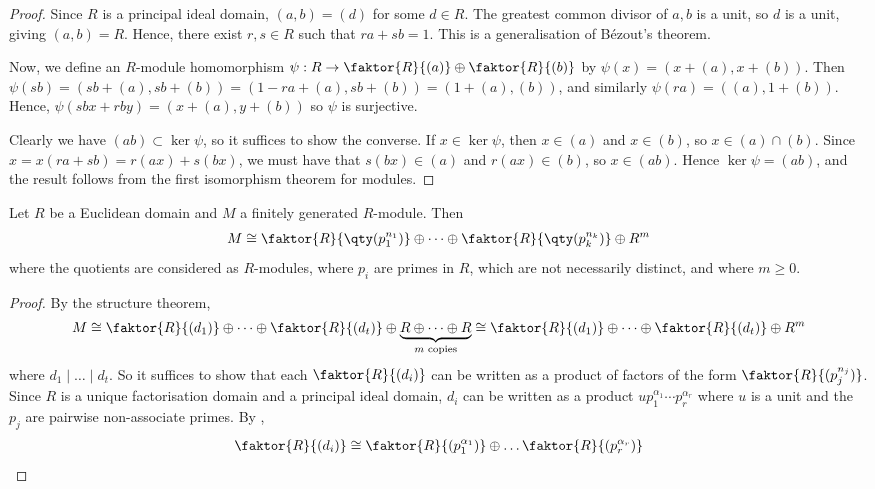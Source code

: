 \begin{proof}
	Since $R$ is a principal ideal domain, $(a,b) = (d)$ for some $d \in R$.
	The greatest common divisor of $a, b$ is a unit, so $d$ is a unit, giving $(a,b) = R$.
	Hence, there exist $r,s \in R$ such that $ra + sb = 1$.
	This is a generalisation of B\'ezout's theorem.

	Now, we define an $R$-module homomorphism $\psi : R \to \faktor{R}{(a)} \oplus \faktor{R}{(b)}$ by $\psi(x) = (x+(a), x+(b))$.
	Then $\psi(sb) = (sb+(a), sb+(b)) = (1-ra+(a),sb+(b)) = (1+(a), (b))$, and similarly $\psi(ra) = ((a),1+(b))$.
	Hence, $\psi(sbx + rby) = (x+(a),y+(b))$ so $\psi$ is surjective.

	Clearly we have $(ab) \subset \ker \psi$, so it suffices to show the converse.
	If $x \in \ker \psi$, then $x \in (a)$ and $x \in (b)$, so $x \in (a) \cap (b)$.
	Since $x = x(ra+sb) = r(ax) + s(bx)$, we must have that $s(bx) \in (a)$ and $r(ax) \in (b)$, so $x \in (ab)$.
	Hence $\ker \psi = (ab)$, and the result follows from the first isomorphism theorem for modules.
\end{proof}

\begin{lemma}
	Let $R$ be a Euclidean domain and $M$ a finitely generated $R$-module.
	Then
	\begin{align*}
		M \cong \faktor{R}{\qty(p_1^{n_1})} \oplus \dots \oplus \faktor{R}{\qty(p_k^{n_k})} \oplus R^m
	\end{align*}
	where the quotients are considered as $R$-modules, where $p_i$ are primes in $R$, which are not necessarily distinct, and where $m \geq 0$.
\end{lemma}

\begin{proof}
	By the structure theorem,
	\begin{align*}
		M \cong \faktor{R}{(d_1)} \oplus \dots \oplus \faktor{R}{(d_t)} \oplus \underbrace{R \oplus \dots \oplus R}_{m \text{ copies}} \cong \faktor{R}{(d_1)} \oplus \dots \oplus \faktor{R}{(d_t)} \oplus R^m
	\end{align*}
	where $d_1 \mid \dots \mid d_t$.
	So it suffices to show that each $\faktor{R}{(d_i)}$ can be written as a product of factors of the form $\faktor{R}{(p_j^{n_j})}$.
	Since $R$ is a unique factorisation domain and a principal ideal domain, $d_i$ can be written as a product $u p_1^{\alpha_1} \cdots p_r^{\alpha_r}$ where $u$ is a unit and the $p_j$ are pairwise non-associate primes.
	By ,
	\begin{align*}
		\faktor{R}{(d_i)} \cong \faktor{R}{(p_1^{\alpha_1})} \oplus \dots \faktor{R}{(p_r^{\alpha_r})}
	\end{align*}
\end{proof}

